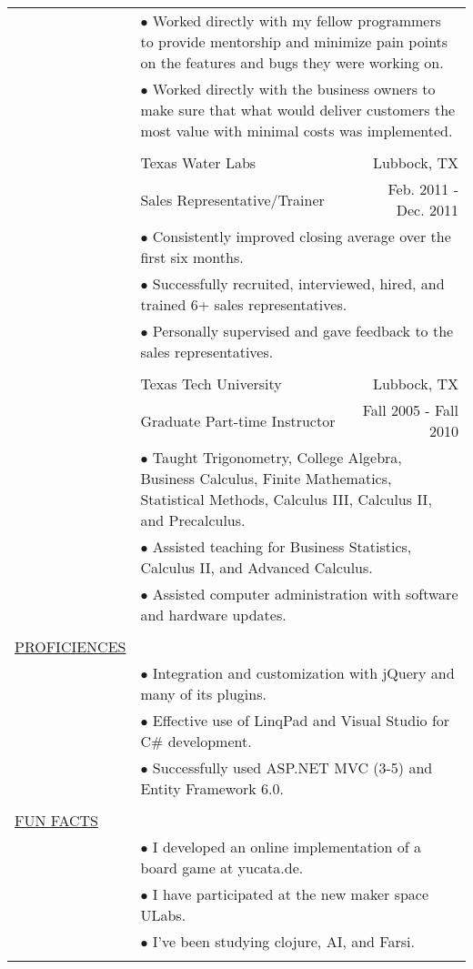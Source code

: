 \documentclass[11pt,oneside,letterpaper,titlepage,fleqn]{article}
\begin{document}
\begin{tabular}[h]{@{}p{3.25cm}@{}lr}
           & \multicolumn{2}{p{14cm}}{$\bullet$ Worked directly with my fellow programmers to provide mentorship and minimize pain points
 on the features and bugs they were working on.}\\			
           & \multicolumn{2}{p{14cm}}{$\bullet$ Worked directly with the business owners to make sure that what would deliver customers the
 most value with minimal costs was implemented.}\\
\\
						& Texas Water Labs & Lubbock, TX\\
						& Sales Representative/Trainer	 &  Feb. 2011 - Dec. 2011\\
           & \multicolumn{2}{p{14cm}}{$\bullet$ Consistently improved closing average over the first six months.}\\
           & \multicolumn{2}{p{14cm}}{$\bullet$ Successfully recruited, interviewed, hired, and trained 6+ sales representatives.}\\
           & \multicolumn{2}{p{14cm}}{$\bullet$ Personally supervised and gave feedback to the sales representatives.}\\
\\
						& Texas Tech University & Lubbock, TX\\
						& Graduate Part-time Instructor	 &  Fall 2005 - Fall 2010\\
           & \multicolumn{2}{p{14cm}}{$\bullet$ Taught Trigonometry, College Algebra, Business Calculus, Finite Mathematics, Statistical
Methods, Calculus III, Calculus II, and Precalculus.}\\
           & \multicolumn{2}{p{14cm}}{$\bullet$ Assisted teaching for Business Statistics, Calculus II, and Advanced Calculus.}\\
           & \multicolumn{2}{p{14cm}}{$\bullet$ Assisted computer administration with software and hardware updates.}\\
\\
\underline{PROFICIENCES}\\    
           & \multicolumn{2}{p{14cm}}{$\bullet$ Integration and customization with jQuery and many of its plugins.}\\
           & \multicolumn{2}{p{14cm}}{$\bullet$ Effective use of LinqPad and Visual Studio for C# development.}\\
           & \multicolumn{2}{p{14cm}}{$\bullet$ Successfully used ASP.NET MVC (3-5) and Entity Framework 6.0.}\\					
\\
\underline{FUN FACTS}\\    
           & \multicolumn{2}{p{14cm}}{$\bullet$ I developed an online implementation of a board game at yucata.de.}\\
           & \multicolumn{2}{p{14cm}}{$\bullet$ I have participated at the new maker space ULabs.}\\
           & \multicolumn{2}{p{14cm}}{$\bullet$ I've been studying clojure, AI, and Farsi.}\\					
\\					  				
\end{tabular}
\end{document}
